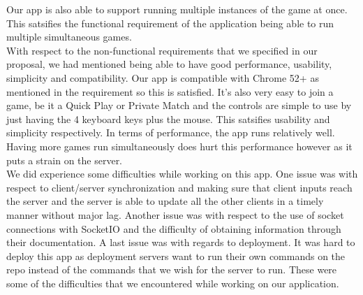 \documentclass[11pt, oneside]{article}   	%
\begin{document}
Our app is also able to support running multiple instances of the game at once. This satsifies
the functional requirement of the application being able to run multiple simultaneous games.\\

With respect to the non-functional requirements that we specified in our proposal, we had
mentioned being able to have good performance, usability, simplicity and compatibility.
Our app is compatible with Chrome 52+ as mentioned in the requirement so this is satisfied.
It's also very easy to join a game, be it a Quick Play or Private Match and the controls are
simple to use by just having the 4 keyboard keys plus the mouse. This satsifies usability and
simplicity respectively. In terms of performance, the app runs relatively well. Having more
games run simultaneously does hurt this performance however as it puts a strain on the server.\\

We did experience some difficulties while working on this app. One issue was with respect to
client/server synchronization and making sure that client inputs reach the server and the server
is able to update all the other clients in a timely manner without major lag. Another issue
was with respect to the use of socket connections with SocketIO and the difficulty of obtaining
information through their documentation. A last issue was with regards to deployment. It was
hard to deploy this app as deployment servers want to run their own commands on the repo instead
of the commands that we wish for the server to run. These were some of the difficulties that
we encountered while working on our application.
\end{document}
